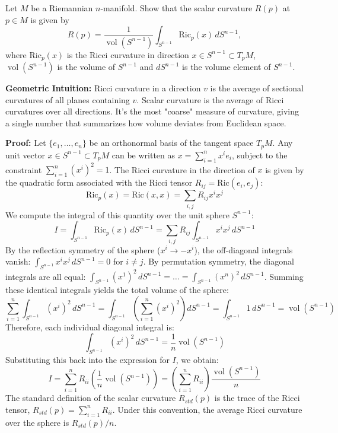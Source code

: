 \begin{exercise}
\label{geometry:2011:11}
Let $M$ be a Riemannian $n$-manifold. Show that the scalar curvature $R(p)$ at $p \in M$ is given by
\[ R(p) = \frac{1}{\operatorname{vol}(S^{n-1})} \int_{S^{n-1}} \mathrm{Ric}_{p}(x)\, dS^{n-1}, \]
where $\mathrm{Ric}_{p}(x)$ is the Ricci curvature in direction $x \in S^{n-1} \subset T_{p}M$, $\operatorname{vol}(S^{n-1})$ is the volume of $S^{n-1}$ and $dS^{n-1}$ is the volume element of $S^{n-1}$.
\end{exercise}

\begin{solution}
\textbf{Geometric Intuition:} Ricci curvature in a direction $v$ is the average of sectional curvatures of all planes containing $v$. Scalar curvature is the average of Ricci curvatures over all directions. It's the most "coarse" measure of curvature, giving a single number that summarizes how volume deviates from Euclidean space.

\textbf{Proof:} Let $\{e_1, \dots, e_n\}$ be an orthonormal basis of the tangent space $T_p M$. Any unit vector $x \in S^{n-1} \subset T_p M$ can be written as $x = \sum_{i=1}^n x^i e_i$, subject to the constraint $\sum_{i=1}^n (x^i)^2 = 1$.
The Ricci curvature in the direction of $x$ is given by the quadratic form associated with the Ricci tensor $R_{ij} = \mathrm{Ric}(e_i, e_j)$:
\[ \mathrm{Ric}_p(x) = \mathrm{Ric}(x, x) = \sum_{i,j} R_{ij} x^i x^j \]
We compute the integral of this quantity over the unit sphere $S^{n-1}$:
\[ I = \int_{S^{n-1}} \mathrm{Ric}_p(x)\, dS^{n-1} = \sum_{i,j} R_{ij} \int_{S^{n-1}} x^i x^j\, dS^{n-1} \]
By the reflection symmetry of the sphere ($x^i \to -x^i$), the off-diagonal integrals vanish: $\int_{S^{n-1}} x^i x^j\, dS^{n-1} = 0$ for $i \neq j$.
By permutation symmetry, the diagonal integrals are all equal: $\int_{S^{n-1}} (x^1)^2\, dS^{n-1} = \dots = \int_{S^{n-1}} (x^n)^2\, dS^{n-1}$.
Summing these identical integrals yields the total volume of the sphere:
\[ \sum_{i=1}^n \int_{S^{n-1}} (x^i)^2\, dS^{n-1} = \int_{S^{n-1}} \left( \sum_{i=1}^n (x^i)^2 \right) dS^{n-1} = \int_{S^{n-1}} 1\, dS^{n-1} = \operatorname{vol}(S^{n-1}) \]
Therefore, each individual diagonal integral is:
\[ \int_{S^{n-1}} (x^i)^2\, dS^{n-1} = \frac{1}{n} \operatorname{vol}(S^{n-1}) \]
Substituting this back into the expression for $I$, we obtain:
\[ I = \sum_{i=1}^n R_{ii} \left( \frac{1}{n} \operatorname{vol}(S^{n-1}) \right) = \left( \sum_{i=1}^n R_{ii} \right) \frac{\operatorname{vol}(S^{n-1})}{n} \]
The standard definition of the scalar curvature $R_{std}(p)$ is the trace of the Ricci tensor, $R_{std}(p) = \sum_{i=1}^n R_{ii}$. Under this convention, the average Ricci curvature over the sphere is $R_{std}(p) / n$.


\end{solution}
